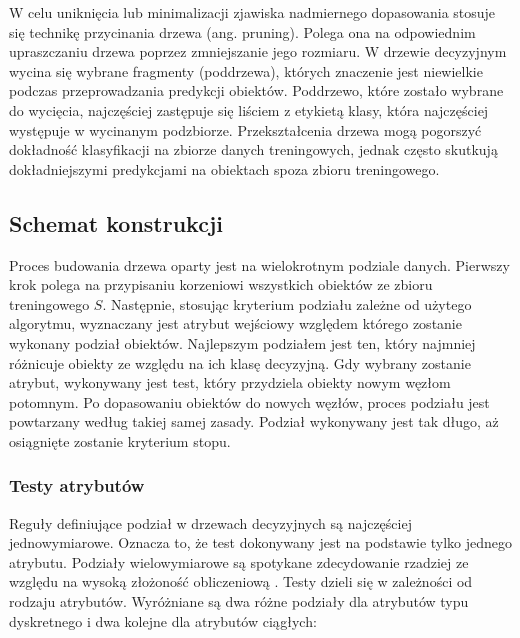 \documentclass[12pt]{article}
\begin{document}
W celu uniknięcia lub minimalizacji zjawiska nadmiernego dopasowania stosuje się technikę przycinania drzewa (ang. pruning).
Polega ona na odpowiednim upraszczaniu drzewa poprzez zmniejszanie jego rozmiaru.
W drzewie decyzyjnym wycina się wybrane fragmenty (poddrzewa), których znaczenie jest niewielkie podczas przeprowadzania
predykcji obiektów. Poddrzewo, które zostało wybrane do wycięcia, najczęściej zastępuje się liściem z etykietą klasy, która
najczęściej występuje w wycinanym podzbiorze. Przekształcenia drzewa mogą pogorszyć dokładność klasyfikacji
na zbiorze danych treningowych, jednak często skutkują dokładniejszymi predykcjami na obiektach spoza zbioru treningowego.

\subsection{Schemat konstrukcji}
Proces budowania drzewa oparty jest na wielokrotnym podziale danych. Pierwszy krok polega na przypisaniu
korzeniowi wszystkich obiektów ze zbioru treningowego $S$. Następnie, stosując kryterium podziału zależne od
użytego algorytmu, wyznaczany jest atrybut wejściowy względem którego zostanie wykonany podział obiektów.
Najlepszym podziałem jest ten, który najmniej różnicuje obiekty ze względu na ich klasę decyzyjną.
Gdy wybrany zostanie atrybut, wykonywany jest test, który przydziela obiekty nowym węzłom potomnym.
Po dopasowaniu obiektów do nowych węzłów, proces podziału jest powtarzany według takiej samej zasady.
Podział wykonywany jest tak długo, aż osiągnięte zostanie kryterium stopu.

\subsubsection{Testy atrybutów}
Reguły definiujące podział w drzewach decyzyjnych są najczęściej jednowymiarowe.
Oznacza to, że test dokonywany jest na podstawie tylko jednego atrybutu.
Podziały wielowymiarowe są spotykane zdecydowanie rzadziej ze względu na wysoką złożoność obliczeniową \cite{eksploracja-danych}.
Testy dzieli się w zależności od rodzaju atrybutów. Wyróżniane są dwa różne podziały dla atrybutów typu dyskretnego i
dwa kolejne dla atrybutów ciągłych:
\newpage
\end{document}

